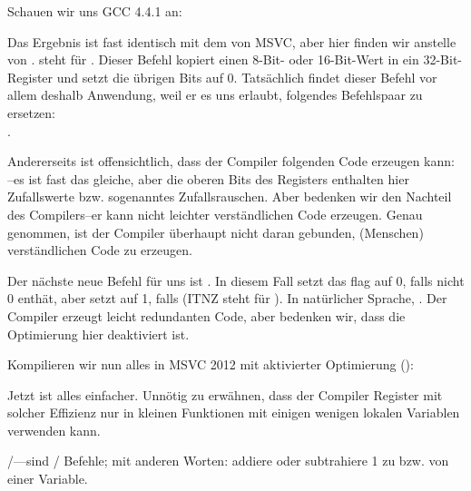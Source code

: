 
Schauen wir uns GCC 4.4.1 an:



\label{movzx}

Das Ergebnis ist fast identisch mit dem von MSVC, aber hier finden wir \MOVZX
anstelle von \MOVSX. 
\MOVZX steht für . 
Dieser Befehl kopiert einen 8-Bit- oder 16-Bit-Wert in ein 32-Bit-Register und
setzt die übrigen Bits auf 0.
Tatsächlich findet dieser Befehl vor allem deshalb Anwendung, weil er es uns
erlaubt, folgendes Befehlspaar zu ersetzen:\\
.

Andererseits ist offensichtlich, dass der Compiler folgenden Code erzeugen kann:
\\
--es ist fast das gleiche, aber die
oberen Bits des \EAX Registers enthalten hier Zufallswerte bzw.
sogenanntes Zufallsrauschen.
Aber bedenken wir den Nachteil des Compilers--er kann nicht leichter
verständlichen Code erzeugen. 
Genau genommen, ist der Compiler überhaupt nicht daran gebunden, (Menschen)
verständlichen Code zu erzeugen.


Der nächste neue Befehl für uns ist \SETNZ.
In diesem Fall setzt  das \ZF flag auf 0, falls \AL nicht 0
enthät, aber \SETNZ setzt \AL auf 1, falls  (IT{NZ} steht für
).
In natürlicher Sprache, . 
Der Compiler erzeugt leicht redundanten Code, aber bedenken wir, dass die
Optimierung hier deaktiviert ist.

\label{strlen_MSVC_Ox}

Kompilieren wir nun alles in MSVC 2012 mit aktivierter Optimierung (\Ox):



Jetzt ist alles einfacher.
Unnötig zu erwähnen, dass der Compiler Register mit solcher Effizienz nur in
kleinen Funktionen mit einigen wenigen lokalen Variablen verwenden kann.

\INC/\DEC---sind / Befehle; mit anderen Worten:
addiere oder subtrahiere 1 zu bzw. von einer Variable. 


